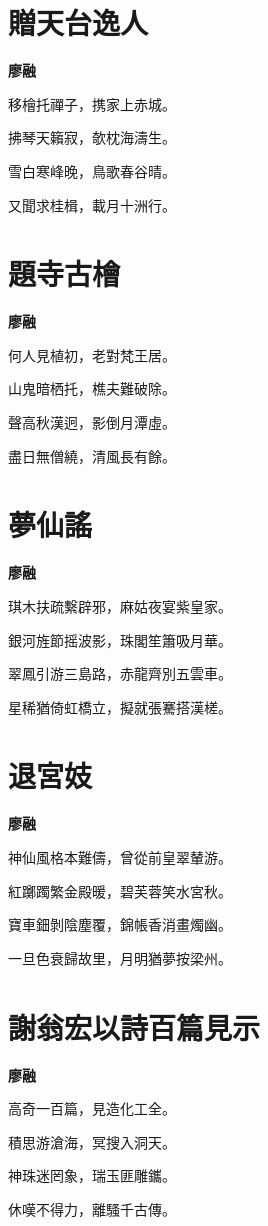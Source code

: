\documentclass[12pt,a4paper]{ctexbook}
\begin{document}
\section{贈天台逸人}
\textbf{廖融}\par\vspace{0.5em}
移檜托禪子，携家上赤城。\par
拂琴天籟寂，欹枕海濤生。\par
雪白寒峰晚，鳥歌春谷晴。\par
又聞求桂楫，載月十洲行。\par

\section{題寺古檜}
\textbf{廖融}\par\vspace{0.5em}
何人見植初，老對梵王居。\par
山鬼暗栖托，樵夫難破除。\par
聲高秋漢迥，影倒月潭虛。\par
盡日無僧繞，清風長有餘。\par

\section{夢仙謠}
\textbf{廖融}\par\vspace{0.5em}
琪木扶疏繫辟邪，麻姑夜宴紫皇家。\par
銀河旌節摇波影，珠閣笙簫吸月華。\par
翠鳳引游三島路，赤龍齊別五雲車。\par
星稀猶倚虹橋立，擬就張騫搭漢槎。\par

\section{退宮妓}
\textbf{廖融}\par\vspace{0.5em}
神仙風格本難儔，曾從前皇翠輦游。\par
紅躑躅繁金殿暖，碧芙蓉笑水宮秋。\par
寶車鈿剝陰塵覆，錦帳香消畫燭幽。\par
一旦色衰歸故里，月明猶夢按梁州。\par

\section{謝翁宏以詩百篇見示}
\textbf{廖融}\par\vspace{0.5em}
高奇一百篇，見造化工全。\par
積思游滄海，冥搜入洞天。\par
神珠迷罔象，瑞玉匪雕鑴。\par
休嘆不得力，離騷千古傳。\par
\end{document}
